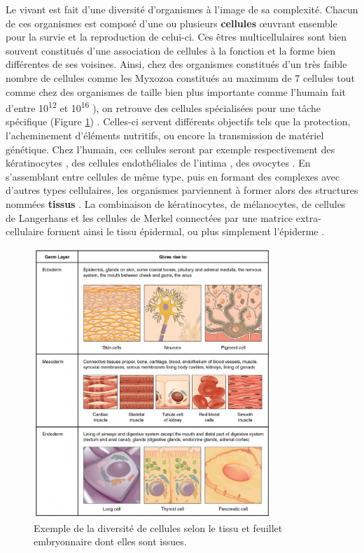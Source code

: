 Le vivant est fait d'une diversité d'organismes à l'image de sa complexité. Chacun de ces organismes est composé d'une ou plusieurs \textbf{cellules} œuvrant ensemble pour la survie et la reproduction de celui-ci. Ces êtres multicellulaires sont bien souvent constitués d’une association de cellules à la fonction et la forme bien différentes de ses voisines. Ainsi, chez des organismes constitués d'un très faible nombre de cellules comme les Myxozoa constitués au maximum de 7 cellules \cite{Morris2010Aug} tout comme chez des organismes de taille bien plus importante comme l'humain fait d'entre 10\textsuperscript{12} et 10\textsuperscript{16} \cite{Bianconi2013}), on retrouve des cellules spécialisées pour une tâche spécifique \cite{Panina2020Sep} (Figure \ref{fig:intro_tissu_type_cellulaire}) . Celles-ci servent différents objectifs tels que la protection, l'acheminement d'éléments nutritifs, ou encore la transmission de matériel génétique. Chez l’humain, ces cellules seront par exemple respectivement des kératinocytes \cite{Yuki2007Apr}, des cellules endothéliales de l’intima \cite{Yuan1991Aug}, des ovocytes \cite{Trounson2013}. En s’assemblant entre cellules de même type, puis en formant des complexes avec d’autres types cellulaires, les organismes parviennent à former alors des structures nommées \textbf{tissus} \cite{Hekselman2020Mar}. La combinaison de kératinocytes, de mélanocytes, de cellules de Langerhans et les cellules de Merkel connectées par une matrice extra-cellulaire forment ainsi le tissu épidermal, ou plus simplement l’épiderme \cite{Bettley1965}.

\begin{figure}[hb!]
    \centering
    \includegraphics[width=0.8\textwidth]{img/intro/cell_type_feuillet.jpg}
    \caption{Exemple de la diversité de cellules selon le tissu et feuillet embryonnaire dont elles sont issues.}
    \label{fig:intro_tissu_type_cellulaire}
\end{figure}


